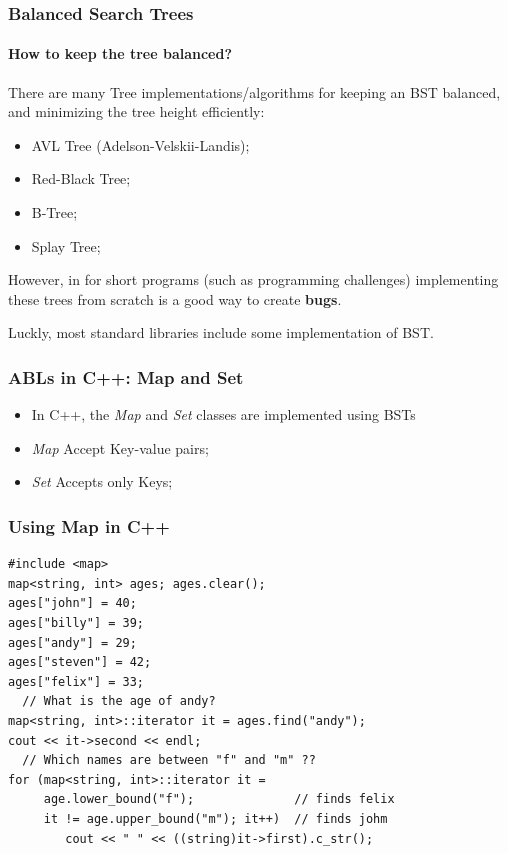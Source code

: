 \begin{frame}
  \frametitle{Balanced Search Trees}
  \framesubtitle{How to keep the tree balanced?}

  There are many Tree implementations/algorithms for keeping an BST
  balanced, and minimizing the tree height efficiently:
  \begin{itemize}
  \item AVL Tree (Adelson-Velskii-Landis);
  \item Red-Black Tree;
  \item B-Tree;
  \item Splay Tree;
  \end{itemize}
  \bigskip

  However, in for short programs (such as programming challenges)
  implementing these trees from scratch is a good way to create {\bf bugs}.
  \bigskip

  Luckly, most standard libraries include some implementation of BST.
\end{frame}

\begin{frame}
  \frametitle{ABLs in C++: Map and Set}

  \begin{itemize}
  \item In C++, the \emph{Map} and \emph{Set} classes are implemented
    using BSTs
  \item \emph{Map} Accept Key-value pairs;
  \item \emph{Set} Accepts only Keys;
  \end{itemize}

\end{frame}

\begin{frame}[fragile]
  \frametitle{Using Map in C++}
  {\small
  \begin{block}{}
\begin{verbatim}
#include <map>
map<string, int> ages; ages.clear();
ages["john"] = 40;
ages["billy"] = 39;
ages["andy"] = 29;
ages["steven"] = 42;
ages["felix"] = 33;
  // What is the age of andy?
map<string, int>::iterator it = ages.find("andy");
cout << it->second << endl;
  // Which names are between "f" and "m" ??
for (map<string, int>::iterator it =
     age.lower_bound("f");              // finds felix
     it != age.upper_bound("m"); it++)  // finds johm
        cout << " " << ((string)it->first).c_str();
\end{verbatim}
\end{block}}
\end{frame}

